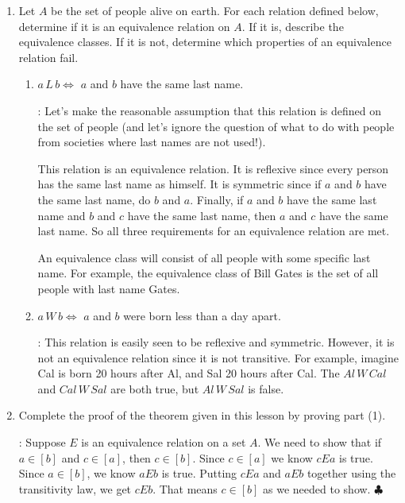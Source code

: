 \documentclass[11pt]{amsart}
\begin{document}
\begin{enumerate}

\item Let $A$ be the set of people alive on earth. 
For each relation defined below, determine if
it is an equivalence relation on $A$. If it is, describe the equivalence classes.
If it is not, determine which properties of an equivalence relation fail.

\begin{enumerate}

\item $a\,L\,b \iff$  $a$ and $b$ have the same last name.

\medskip

: Let's make the reasonable assumption that this relation
is defined on the set of people (and let's ignore the question of what to
do with people from societies where last names are not used!).

This relation is an equivalence relation. It is reflexive since 
every person has the same
last name as himself. It is symmetric since if $a$ and $b$ have the same last name,
do $b$ and $a$. Finally, if $a$ and $b$ have the same last name and $b$ and $c$ 
have the same last name, then $a$ and $c$ have the same last name. So all three
requirements for an equivalence relation are met.

An equivalence class will consist of all people with some specific last name. For example, the equivalence class
of Bill Gates is the set of all people with last name Gates.

\medskip

\item $a\,W\,b \iff$ $a$ and $b$ were born less than a day apart.
\medskip

: This relation is easily seen to be reflexive and symmetric.
However, it is not an equivalence relation since it is not transitive. For example,
imagine Cal is born 20 hours after Al, and Sal 20 hours after Cal. The $Al\,W\,Cal$
and $Cal\,W\,Sal$ are both true, but $Al\,W\,Sal$ is false. 

\end{enumerate}
\medskip




\item Complete the proof of the theorem given in this lesson by proving part (1).

: Suppose $E$ is an equivalence relation on a set $A$. We need to 
show that if $a\in[b]$ and $c\in [a]$, then $c\in [b]$.
 Since $c\in [a]$ we know $cEa$ is true. Since $a\in [b]$, we know $aEb$ is true.
 Putting $cEa$ and $aEb$ together using the transitivity law, we get $cEb$. That means
 $c\in [b]$ as we needed to show. $\clubsuit$
 
\end{enumerate}
\end{document}
